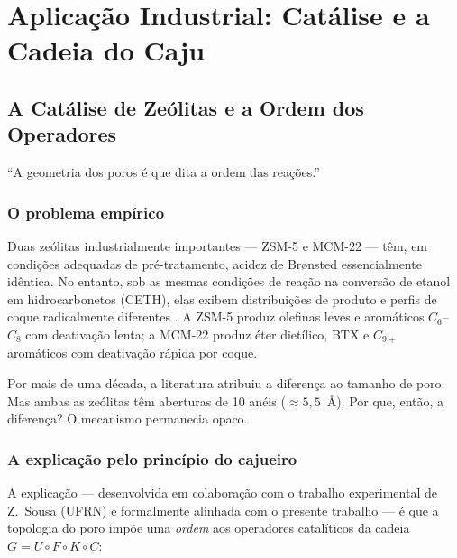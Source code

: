 \documentclass[12pt,a4paper,twoside]{book}
\theoremstyle{plain}
\theoremstyle{definition}
\theoremstyle{definition}
\begin{document}
\part{Aplicação Industrial: Catálise e a Cadeia do Caju}

\chapter{A Catálise de Zeólitas e a Ordem dos Operadores}
\label{cap:catalise}

\epigraph{``A geometria dos poros é que dita a ordem das reações.''}{}

\section{O problema empírico}

Duas zeólitas industrialmente importantes --- ZSM-5 e MCM-22 --- têm,
em condições adequadas de pré-tratamento, acidez de Brønsted essencialmente
idêntica. No entanto, sob as mesmas condições de reação na conversão
de etanol em hidrocarbonetos (CETH), elas exibem distribuições de produto
e perfis de coque radicalmente diferentes \cite{Sousa2014,Sousa2023}.
A ZSM-5 produz olefinas leves e aromáticos $C_{6}$--$C_{8}$ com
deativação lenta; a MCM-22 produz éter dietílico, BTX e $C_{9+}$
aromáticos com deativação rápida por coque.

Por mais de uma década, a literatura atribuiu a diferença ao tamanho de
poro. Mas ambas as zeólitas têm aberturas de 10 anéis ($\approx 5{,}5$~Å).
Por que, então, a diferença? O mecanismo permanecia opaco.

\section{A explicação pelo princípio do cajueiro}

A explicação --- desenvolvida em colaboração com o trabalho experimental
de Z.~Sousa (UFRN) e formalmente alinhada com o presente trabalho ---
é que a topologia do poro impõe uma \emph{ordem} aos operadores
catalíticos da cadeia $G = U \circ F \circ K \circ C$:
\end{document}
